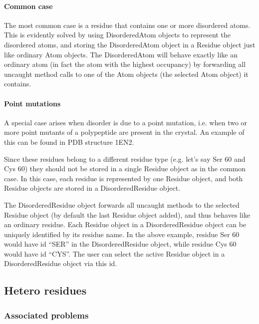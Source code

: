 \documentclass{report}
\begin{document}
\paragraph{Common case}

The most common case is a residue that contains one or more disordered atoms.
This is evidently solved by using DisorderedAtom objects to represent the disordered
atoms, and storing the DisorderedAtom object in a Residue object just like ordinary
Atom objects. The DisorderedAtom will behave exactly like an ordinary atom (in
fact the atom with the highest occupancy) by forwarding all uncaught method
calls to one of the Atom objects (the selected Atom object) it contains. 


\paragraph{Point mutations\label{point mutations}}

A special case arises when disorder is due to a point mutation, i.e. when two
or more point mutants of a polypeptide are present in the crystal. An example
of this can be found in PDB structure 1EN2. 

Since these residues belong to a different residue type (e.g. let's say Ser
60 and Cys 60) they should not be stored in a single Residue object as in the
common case. In this case, each residue is represented by one Residue object,
and both Residue objects are stored in a DisorderedResidue object. 

The DisorderedResidue object forwards all uncaught methods to the selected Residue
object (by default the last Residue object added), and thus behaves like an
ordinary residue. Each Residue object in a DisorderedResidue object can be uniquely
identified by its residue name. In the above example, residue Ser 60 would have
id {}``SER{}'' in the DisorderedResidue object, while residue Cys 60 would
have id {}``CYS{}''. The user can select the active Residue object in a DisorderedResidue
object via this id.


\subsection{Hetero residues}


\subsubsection{Associated problems\label{hetero probems}}
\end{document}

